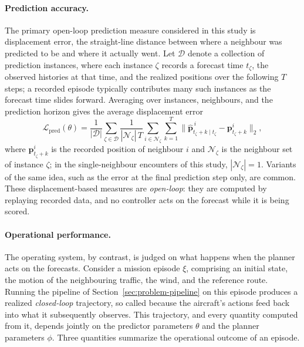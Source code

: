 \documentclass[11pt]{article}
\theoremstyle{plain}
\theoremstyle{definition}
\begin{document}
\paragraph{Prediction accuracy.}
The primary open-loop prediction measure considered in this study is
displacement error, the straight-line distance between where a neighbour was predicted
to be and where it actually went. Let $\mathcal{D}$ denote a collection
of prediction instances, where each instance $\zeta$ records a forecast
time $t_{\zeta}$, the observed histories at that time, and the realized
positions over the following $T$ steps; a recorded episode typically
contributes many such instances as the forecast time slides forward.
Averaging over instances, neighbours, and the prediction horizon gives
the average displacement error
\begin{equation}
	\label{eq:ade-loss}
	\mathcal{L}_{\mathrm{pred}}(\theta)
	= \frac{1}{|\mathcal{D}|} \sum_{\zeta \in \mathcal{D}}
	\frac{1}{|\mathcal{N}_{\zeta}|\, T}
	\sum_{i \in \mathcal{N}_{\zeta}} \sum_{k=1}^{T}
	\big\| \hat{\bm{p}}^{\,i}_{t_{\zeta}+k \mid t_{\zeta}}
	- \bm{p}^{i}_{t_{\zeta}+k} \big\|_2,
\end{equation}
where $\bm{p}^{i}_{t_{\zeta}+k}$ is the recorded position of neighbour
$i$ and $\mathcal{N}_{\zeta}$ is the neighbour set of instance $\zeta$;
in the single-neighbour encounters of this study,
$|\mathcal{N}_{\zeta}| = 1$.
Variants of the same idea, such as the error at the final prediction
step only, are common. These displacement-based measures are
\emph{open-loop}: they are computed by replaying recorded data, and no
controller acts on the forecast while it is being scored.
 
\paragraph{Operational performance.}
The operating system, by contrast, is judged on what happens when the
planner acts on the forecasts. Consider a mission episode $\xi$,
comprising an initial state, the motion of the neighbouring traffic, the
wind, and the reference route. Running the pipeline of
Section~\ref{sec:problem-pipeline} on this episode produces a realized
\emph{closed-loop} trajectory, so called because the aircraft's actions
feed back into what it subsequently observes. This trajectory, and every
quantity computed from it, depends jointly on the predictor parameters
$\theta$ and the planner parameters $\phi$. Three quantities summarize the
operational outcome of an episode.
 
\end{document}
